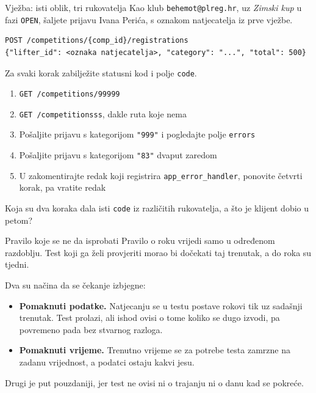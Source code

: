 \begin{frame}[fragile]{Vježba: isti oblik, tri rukovatelja}
Kao klub \texttt{behemot@plreg.hr}, uz \emph{Zimski kup} u fazi \texttt{OPEN}, šaljete prijavu Ivana Perića, s oznakom natjecatelja iz prve vježbe.

\begin{lstlisting}
POST /competitions/{comp_id}/registrations
{"lifter_id": <oznaka natjecatelja>, "category": "...", "total": 500}
\end{lstlisting}

\vspace{0.2em}
Za svaki korak zabilježite statusni kod i polje \texttt{code}.

\begin{enumerate}
  \itemsep0.15em
  \item \texttt{GET /competitions/99999}
  \item \texttt{GET /competitionsss}, dakle ruta koje nema
  \item Pošaljite prijavu s kategorijom \texttt{"999"} i pogledajte polje \texttt{errors}
  \item Pošaljite prijavu s kategorijom \texttt{"83"} dvaput zaredom
  \item U  zakomentirajte redak koji registrira \texttt{app\_error\_handler}, ponovite četvrti korak, pa vratite redak
\end{enumerate}

\vspace{0.2em}
Koja su dva koraka dala isti \texttt{code} iz različitih rukovatelja, a što je klijent dobio u petom?
\end{frame}


\begin{frame}{Pravilo koje se ne da isprobati}
Pravilo o roku vrijedi samo u određenom razdoblju. Test koji ga želi provjeriti morao bi dočekati taj trenutak, a do roka su tjedni.

\vspace{0.6em}
Dva su načina da se čekanje izbjegne:

\begin{itemize}
  \item \textbf{Pomaknuti podatke.} Natjecanju se u testu postave rokovi tik uz sadašnji trenutak. Test prolazi, ali ishod ovisi o tome koliko se dugo izvodi, pa povremeno pada bez stvarnog razloga.
  \item \textbf{Pomaknuti vrijeme.} Trenutno vrijeme se za potrebe testa zamrzne na zadanu vrijednost, a podatci ostaju kakvi jesu.
\end{itemize}

\vspace{0.6em}
Drugi je put pouzdaniji, jer test ne ovisi ni o trajanju ni o danu kad se pokreće.
\end{frame}

